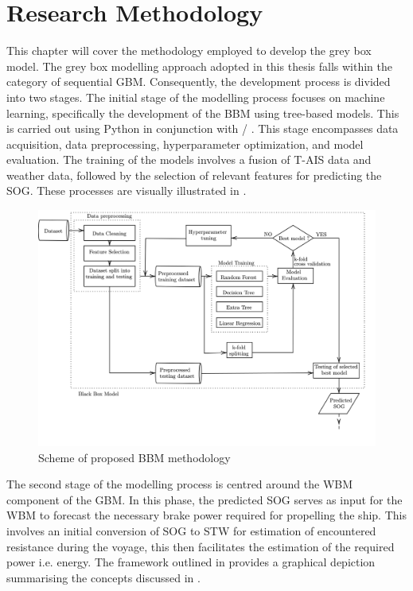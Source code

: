 \chapter{Research Methodology} \label{chp:method}

This chapter will cover the methodology employed to develop the grey box model. The grey box modelling approach adopted in this thesis falls within the category of sequential GBM. Consequently, the development process is divided into two stages. The initial stage of the modelling process focuses on machine learning, specifically the development of the BBM using tree-based models. This is carried out using Python in conjunction with \scikit/ . This stage encompasses data acquisition, data preprocessing, hyperparameter optimization, and model evaluation. The training of the models involves a fusion of T-AIS data and weather data, followed by the selection of relevant features for predicting the SOG. These processes are visually illustrated in .

\begin{figure}[h]
    \centering
        \includegraphics[width=\textwidth]{02_figures/flowmethod_BBM_alt.png}
        \caption{Scheme of proposed BBM methodology}
        \label{fig:flowchart_BBM}
\end{figure}

The second stage of the modelling process is centred around the WBM component of the GBM. In this phase, the predicted SOG serves as input for the WBM to forecast the necessary brake power required for propelling the ship. This involves an initial conversion of SOG to STW for estimation of encountered resistance during the voyage, this then facilitates the estimation of the required power i.e. energy. The framework outlined in  provides a graphical depiction summarising the concepts discussed in .

